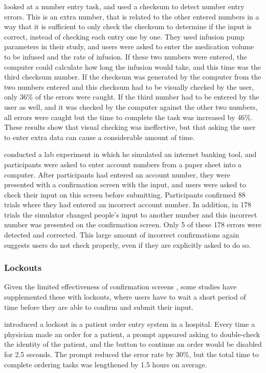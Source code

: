 \citet{Wiseman2013a} looked at a number entry task, and used a checksum to detect number entry errors. This is an extra number, that is related to the other entered numbers in a way that it is sufficient to only check the checksum to determine if the input is correct, instead of checking each entry one by one. 
They used infusion pump parameters in their study, and users were asked to enter the medication volume to be infused and the rate of infusion. If these two numbers were entered, the computer could calculate how long the infusion would take, and this time was the third checksum number.
If the checksum was generated by the computer from the two numbers entered and this checksum had to be visually checked by the user, only 36\% of the errors were caught. If the third number had to be entered by the user as well, and it was checked by the computer against the other two numbers, all errors were caught but the time to complete the task was increased by 46\%. These results show that visual checking was ineffective, but that asking the user to enter extra data can cause a considerable amount of time.

\citet{Olsen2008} conducted a lab experiment in which he simulated an internet banking tool, and participants were asked to enter account numbers from a paper sheet into a computer. After participants had entered an account number, they were presented with a confirmation screen with the input, and users were asked to check their input on this screen before submitting. 
Participants confirmed 88 trials where they had entered an incorrect account number. In addition, in 178 trials the simulator changed people's input to another number and this incorrect number was presented on the confirmation screen. Only 5 of these 178 errors were detected and corrected. This large amount of incorrect confirmations again suggests users do not check properly, even if they are explicitly asked to do so. 

\subsubsection{Lockouts}
Given the limited effectiveness of confirmation screens \citep{Norman2002, Olsen2008}, some studies have supplemented these with lockouts, where users have to wait a short period of time before they are able to confirm and submit their input. 

\citet{Green2014} introduced a lockout in a patient order entry system in a hospital. Every time a physician made an order for a patient, a prompt appeared asking to double-check the identity of the patient, and the button to continue an order would be disabled for 2.5 seconds. The prompt reduced the error rate by 30\%, but the total time to complete ordering tasks was lengthened by 1.5 hours on average. 

